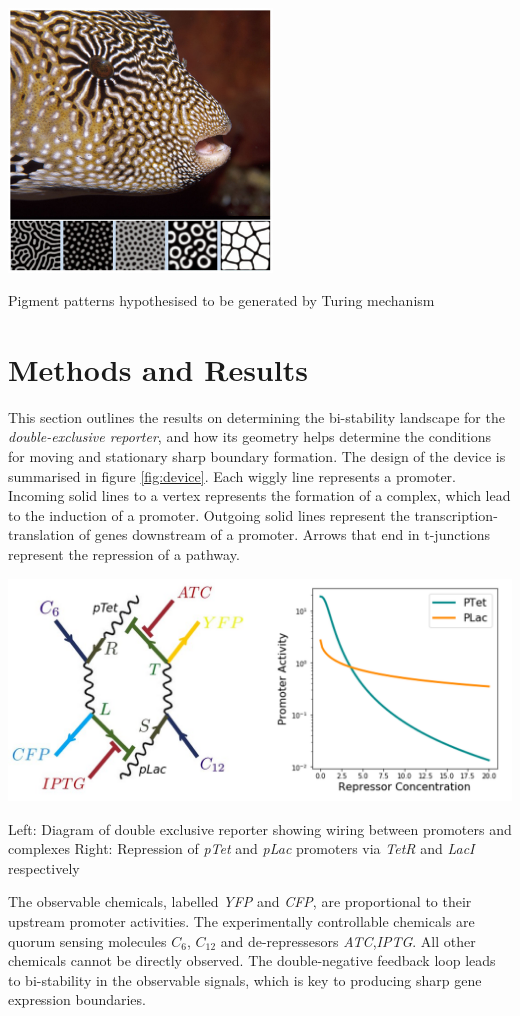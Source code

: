 \begin{Figure}
\includegraphics[width=70mm]{figures/turing.png}
\caption{Pigment patterns hypothesised to be generated by Turing mechanism}
\label{fig:gap}
\end{Figure}

\section{Methods and Results}
This section outlines the results on determining the bi-stability landscape for the
\textit{double-exclusive reporter}, and how its geometry helps determine the conditions for
moving and stationary sharp boundary formation. The design of the device is summarised 
in figure \ref{fig:device}. Each wiggly line represents a promoter. Incoming solid lines
to a vertex represents the formation of a complex, which lead to the induction of a promoter.
Outgoing solid lines represent the transcription-translation of genes downstream of a
promoter. Arrows that end in t-junctions represent the repression of a pathway.

\begin{Figure}
\includegraphics[width=140mm]{figures/device.png}
\caption{Left: Diagram of double exclusive reporter showing wiring between promoters
and complexes Right: Repression of \textit{pTet} and \textit{pLac} promoters via
\textit{TetR} and \textit{LacI} respectively}
\label{fig:device}
\end{Figure}
\noindent
The observable chemicals, labelled \textit{YFP} and \textit{CFP}, are
proportional to their upstream promoter activities. The experimentally controllable chemicals
are quorum sensing molecules $C_6$, $C_{12}$ and de-repressesors \textit{ATC},\textit{IPTG}.
All other chemicals cannot be directly observed. The double-negative feedback loop leads
to bi-stability in the observable signals, which is key to producing sharp gene
expression boundaries.


